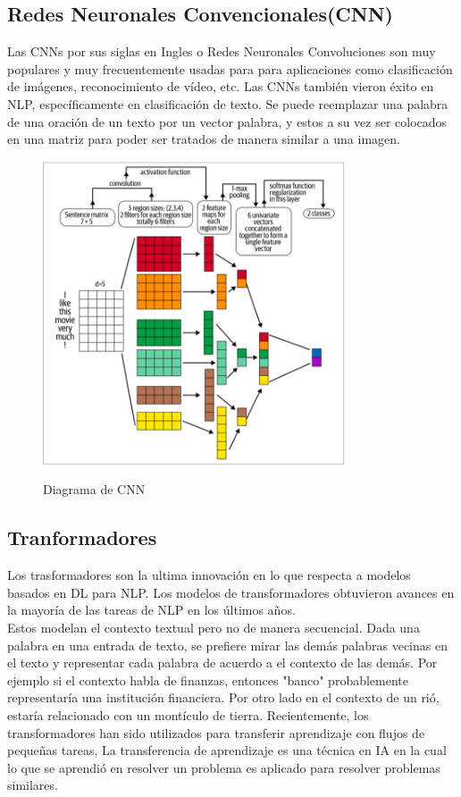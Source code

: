 \subsection{Redes Neuronales Convencionales(CNN)}
Las CNNs por sus siglas en Ingles o Redes Neuronales Convoluciones son muy populares y muy frecuentemente usadas para 
para aplicaciones como clasificación de imágenes, reconocimiento de vídeo, etc. Las CNNs también vieron éxito en NLP, 
específicamente en clasificación de texto. Se puede reemplazar una palabra de una oración de un texto por un vector
palabra, y estos a su vez ser colocados en una matriz para poder ser tratados de manera similar a una imagen.

\begin{figure}[H]
    \centering
    \includegraphics[width=0.8\textwidth]{imagenes/Cap 2/cnn.png}
    \caption{Diagrama de CNN}
    \label{fig:RNN}
    \cite{sowmya_practical_npl}
\end{figure}

\subsection{Tranformadores}

Los trasformadores son la ultima innovación en lo que respecta a modelos basados en DL para NLP. Los 
modelos de transformadores obtuvieron avances en la mayoría de las tareas de NLP en los últimos años. \\
Estos modelan el contexto textual pero no de manera secuencial. Dada una palabra en una entrada de texto, se
prefiere mirar las demás palabras vecinas en el texto y representar cada palabra de acuerdo a el contexto
de las demás. Por ejemplo si el contexto habla de finanzas, entonces "banco" probablemente representaría una 
institución financiera. Por otro lado en el contexto de un rió, estaría relacionado con un montículo de tierra. 
Recientemente, los transformadores han sido utilizados para transferir aprendizaje con flujos de pequeñas tareas,
La transferencia de aprendizaje es una técnica en IA en la cual lo que se aprendió en resolver un problema es
aplicado para resolver problemas similares.


